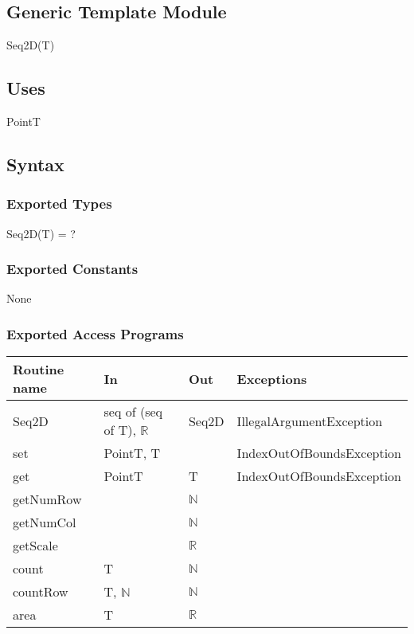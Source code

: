 \documentclass[12pt]{article}
\begin{document}
\subsection* {Generic Template Module}

Seq2D(T)

\subsection* {Uses}

PointT

\subsection* {Syntax}

\subsubsection* {Exported Types}

Seq2D(T) = ?

\subsubsection* {Exported Constants}

None

\subsubsection* {Exported Access Programs}

\begin{tabular}{| l | l | l | p{6cm} |}
\hline
\textbf{Routine name} & \textbf{In} & \textbf{Out} & \textbf{Exceptions}\\
\hline
Seq2D & seq of (seq of T), $\mathbb{R}$ & Seq2D & IllegalArgumentException\\
\hline
set & PointT, T & ~ & IndexOutOfBoundsException\\
\hline
get & PointT & T & IndexOutOfBoundsException\\
\hline
getNumRow & ~ & $\mathbb{N}$ & \\
\hline
getNumCol & ~ & $\mathbb{N}$ & \\
\hline
getScale & ~ & $\mathbb{R}$ & \\
\hline
count & T & $\mathbb{N}$ & \\
\hline
countRow & T, $\mathbb{N}$ & $\mathbb{N}$ & \\
\hline
area & T & $\mathbb{R}$ & \\
\hline
\end{tabular}
\end{document}
